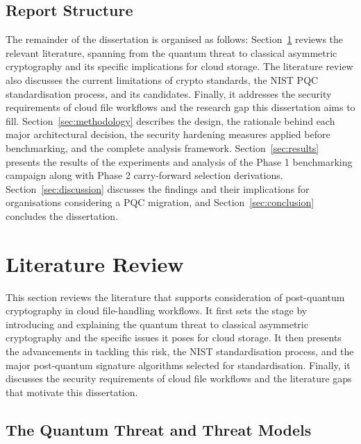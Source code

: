 \documentclass[12pt,a4paper]{article}
\begin{document}
\subsection{Report Structure}

The remainder of the dissertation is organised as follows: Section~\ref{sec:litreview} reviews the relevant literature, spanning from the quantum threat to classical asymmetric cryptography and its specific implications for cloud storage. The literature review also discusses the current limitations of crypto standards, the NIST PQC standardisation process, and its candidates. Finally, it addresses the security requirements of cloud file workflows and the research gap this dissertation aims to fill. Section~\ref{sec:methodology} describes the design, the rationale behind each major architectural decision, the security hardening measures applied before benchmarking, and the complete analysis framework. Section~\ref{sec:results} presents the results of the experiments and analysis of the Phase 1 benchmarking campaign along with Phase 2 carry-forward selection derivations. Section~\ref{sec:discussion} discusses the findings and their implications for organisations considering a PQC migration, and Section~\ref{sec:conclusion} concludes the dissertation.

\newpage
\section{Literature Review}
\label{sec:litreview}

This section reviews the literature that supports consideration of post-quantum cryptography in cloud file-handling workflows. It first sets the stage by introducing and explaining the quantum threat to classical asymmetric cryptography and the specific issues it poses for cloud storage. It then presents the advancements in tackling this risk, the NIST standardisation process, and the major post-quantum signature algorithms selected for standardisation. Finally, it discusses the security requirements of cloud file workflows and the literature gaps that motivate this dissertation.

\subsection{The Quantum Threat and Threat Models}
\end{document}
